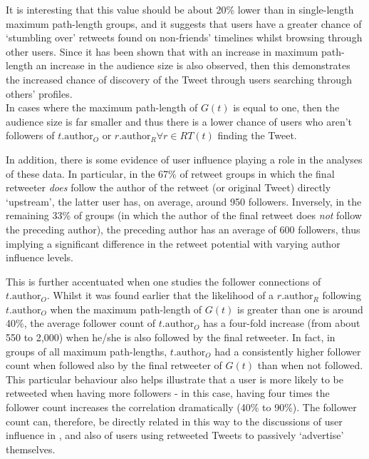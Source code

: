 It is interesting that this value should be about 20\% lower than in single-length maximum path-length groups, and it suggests that users have a greater chance of `stumbling over' retweets found on non-friends' timelines whilst browsing through other users. Since it has been shown that with an increase in maximum path-length an increase in the audience size is also observed, then this demonstrates the increased chance of discovery of the Tweet through users searching through others' profiles.\\
In cases where the maximum path-length of $G(t)$ is equal to one, then the audience size is far smaller and thus there is a lower chance of users who aren't followers of $t.\textrm{author}_O$ or $r.\textrm{author}_R \forall r \in RT(t)$ finding the Tweet.

In addition, there is some evidence of user influence playing a role in the analyses of these data. In particular, in the 67\% of retweet groups in which the final retweeter \textit{does} follow the author of the retweet (or original Tweet) directly `upstream', the latter user has, on average, around 950 followers. Inversely, in the remaining 33\% of groups (in which the author of the final retweet does \textit{not} follow the preceding author), the preceding author has an average of 600 followers, thus implying a significant difference in the retweet potential with varying author influence levels.

This is further accentuated when one studies the follower connections of $t.\textrm{author}_O$. Whilst it was found earlier that the likelihood of a $r.\textrm{author}_R$ following $t.\textrm{author}_O$ when the maximum path-length of $G(t)$ is greater than one is around 40\%, the average follower count of $t.\textrm{author}_O$ has a four-fold increase (from about 550 to 2,000) when he/she is also followed by the final retweeter. In fact, in groups of all maximum path-lengths, $t.\textrm{author}_O$ had a consistently higher follower count when followed also by the final retweeter of $G(t)$ than when not followed.\\
This particular behaviour also helps illustrate that a user is more likely to be retweeted when having more followers - in this case, having four times the follower count increases the correlation dramatically (40\% to 90\%). The follower count can, therefore, be directly related in this way to the discussions of user influence in \cite{cha10}, and also of users using retweeted Tweets to passively `advertise' themselves.

